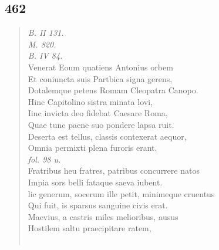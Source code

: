 \documentclass[11pt, a4paper]{report}
\begin{document}
            \subsection*{462}
      \begin{verse}
      \textit{B. II 131.} \\ \textit{M. 820.} \\ \textit{B. IV 84.} \\ Venerat Eoum quatiens Antonius orbem \\ Et coniuncta suis Partbica signa gerens, \\ Dotalemque petens Romam Cleopatra Canopo. \\ Hinc Capitolino sistra minata lovi, \\ Iinc invicta deo fidebat Caesare Roma, \\ Quae tunc paene suo pondere lapsa ruit. \\ Deserta est tellus, classis contexerat aequor, \\ Omnia permixti plena furoris erant. \\ \textit{fol. 98 u.} \\ Fratribus heu fratres, patribus concurrere natos \\ Impia sors belli fataque saeva iubent. \\ lic generum, socerum ille petit, minimeque cruentus \\ Qui fuit,  \lbrack is \rbrack  sparsus sanguine civis erat. \\ Maevius, a castris miles melioribus, ausus \\ Hostilem saltu praecipitare ratem, \\ 
        ﻿\pagebreak 

\end{verse}
\end{document}
